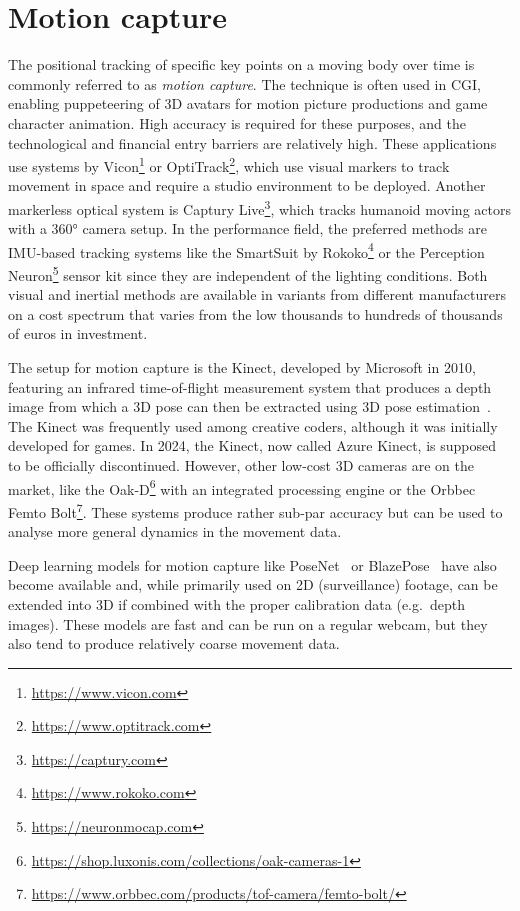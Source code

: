 \section{Motion capture}
\label{sec:motion-capture}

The positional tracking of specific key points on a moving body over time is commonly referred to as \emph{motion capture}.
The technique is often used in \ac{CGI}, enabling puppeteering of \ac{3D} avatars for motion picture productions and game character animation.
High accuracy is required for these purposes, and the technological and financial entry barriers are relatively high.
These applications use systems by Vicon\footnote{\url{https://www.vicon.com}} or OptiTrack\footnote{\url{https://www.optitrack.com}}, which use visual markers to track movement in space and require a studio environment to be deployed.
Another markerless optical system is Captury Live\footnote{\url{https://captury.com}}, which tracks humanoid moving actors with a 360° camera setup.
In the performance field, the preferred methods are IMU-based tracking systems like the SmartSuit by Rokoko\footnote{\url{https://www.rokoko.com}} or the Perception Neuron\footnote{\url{https://neuronmocap.com}} sensor kit since they are independent of the lighting conditions.
Both visual and inertial methods are available in variants from different manufacturers on a cost spectrum that varies from the low thousands to hundreds of thousands of euros in investment.

The  setup for motion capture is the Kinect, developed by Microsoft in 2010, featuring an infrared time-of-flight measurement system that produces a depth image from which a 3D pose can then be extracted using \ac{3D} pose estimation~\parencite[see][]{poseEstimationPaper}.
The Kinect was frequently used among creative coders, although it was initially developed for games.
In 2024, the Kinect, now called Azure Kinect, is supposed to be officially discontinued.
However, other low-cost 3D cameras are on the market, like the Oak-D\footnote{\url{https://shop.luxonis.com/collections/oak-cameras-1}} with an integrated processing engine or the Orbbec Femto Bolt\footnote{\url{https://www.orbbec.com/products/tof-camera/femto-bolt/}}.
These systems produce rather sub-par accuracy but can be used to analyse more general dynamics in the movement data.

Deep learning models for motion capture like PoseNet~\parencite{kendall2016posenet} or BlazePose~\parencite{bazarevsky2020blazepose} have also become available and, while primarily used on 2D (surveillance) footage, can be extended into 3D if combined with the proper calibration data (e.g.\ depth images).
These models are fast and can be run on a regular webcam, but they also tend to produce relatively coarse movement data.

